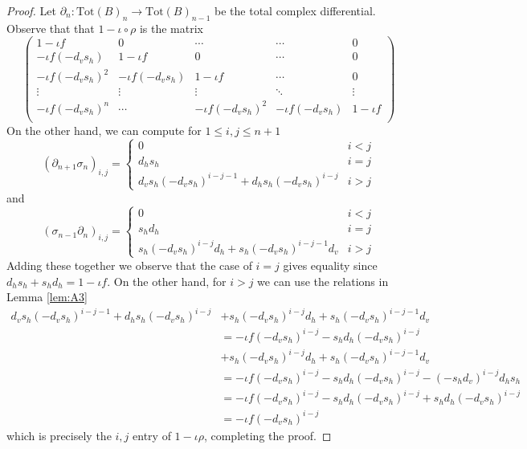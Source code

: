 \begin{proof}
    Let $\partial_n:\text{Tot}(B)_n\to \text{Tot}(B)_{n-1}$ be the total complex differential. Observe that that $1-\iota\circ \rho$ is the matrix 
    \begin{equation*}
            \begin{pmatrix} 
                1-\iota f & 0 & \cdots & \cdots & 0 \\
                -\iota f(-d_vs_h) & 1-\iota f & 0 & \cdots & 0 \\
                -\iota f(-d_vs_h)^2 & -\iota f(-d_vs_h) & 1-\iota f & \cdots & 0 \\
                \vdots & \vdots & \vdots & \ddots & \vdots \\
                -\iota f(-d_vs_h)^n & \cdots & -\iota f(-d_vs_h)^2 & -\iota f(-d_vs_h) & 1-\iota f \\
            \end{pmatrix}
    \end{equation*}
    On the other hand, we can compute for $1 \leq i,j\leq n+1$
    \begin{equation*}
        (\partial_{n+1}\sigma_n)_{i,j} = \left\{
            \begin{array}{cc}
                0 & i < j \\
                d_hs_h & i = j \\
                d_vs_h(-d_vs_h)^{i-j-1}+d_hs_h(-d_vs_h)^{i-j} & i > j 
            \end{array}
        \right.
    \end{equation*}
    and 
    \begin{equation*}
        (\sigma_{n-1}\partial_{n})_{i,j} = \left\{
            \begin{array}{cc}
                0 & i < j \\
                s_hd_h & i = j \\
                s_h(-d_vs_h)^{i-j}d_h + s_h(-d_vs_h)^{i-j-1}d_v & i > j 
            \end{array}
        \right.
    \end{equation*}
    Adding these together we observe that the case of $i=j$ gives equality since $d_hs_h + s_hd_h = 1-\iota f$. On the other hand, for $i > j$ we can use the relations in Lemma \ref{lem:A3}
    \begin{align*}
        d_vs_h(-d_vs_h)^{i-j-1}+d_hs_h(-d_vs_h)^{i-j}&+s_h(-d_vs_h)^{i-j}d_h + s_h(-d_vs_h)^{i-j-1}d_v \\
        &= -\iota f(-d_vs_h)^{i-j}-s_hd_h(-d_vs_h)^{i-j}\\
        &+s_h(-d_vs_h)^{i-j}d_h + s_h(-d_vs_h)^{i-j-1}d_v \tag{by (ii)} \\
        &= -\iota f(-d_vs_h)^{i-j}-s_hd_h(-d_vs_h)^{i-j}-(-s_hd_v)^{i-j}d_hs_h \tag{by (iii)} \\
        &= -\iota f(-d_vs_h)^{i-j}-s_hd_h(-d_vs_h)^{i-j}+s_hd_h(-d_vs_h)^{i-j} \tag{by (iv)} \\
        &= -\iota f(-d_vs_h)^{i-j}
    \end{align*}
    which is precisely the $i,j$ entry of $1-\iota \rho$, completing the proof.
\end{proof}


